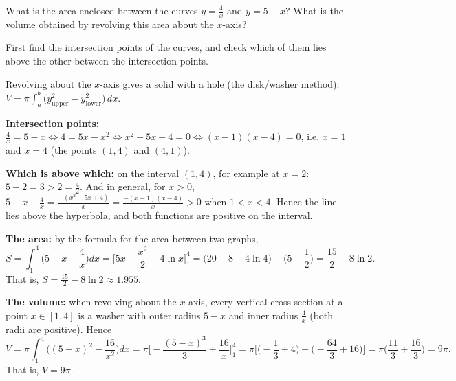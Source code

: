 
\begin{question}
What is the area enclosed between the curves $y=\frac{4}{x}$ and $y=5-x$?
What is the volume obtained by revolving this area about the $x$-axis?
\end{question}

\begin{hint}
First find the intersection points of the curves, and check which of them lies above the other between the intersection points.
\end{hint}

\begin{hint}
Revolving about the $x$-axis gives a solid with a hole (the disk/washer method): $V=\pi\int_a^b\big(y_{\text{upper}}^2-y_{\text{lower}}^2\big)\,dx$.
\end{hint}

\begin{solution}
\textbf{Intersection points:} $\frac4x=5-x \iff 4=5x-x^2 \iff x^2-5x+4=0 \iff (x-1)(x-4)=0$, i.e. $x=1$ and $x=4$ (the points $(1,4)$ and $(4,1)$).

\textbf{Which is above which:} on the interval $(1,4)$, for example at $x=2$: $5-2=3>2=\frac42$. And in general, for $x>0$,
$5-x-\frac4x=\frac{-(x^2-5x+4)}{x}=\frac{-(x-1)(x-4)}{x}>0$ when $1<x<4$. Hence the line lies above the hyperbola, and both functions are positive on the interval.

\textbf{The area:} by the formula for the area between two graphs,
\[ S=\int_1^4\Big(5-x-\frac4x\Big)dx=\Big[5x-\frac{x^2}{2}-4\ln x\Big]_1^4
=\Big(20-8-4\ln4\Big)-\Big(5-\frac12\Big)=\frac{15}{2}-8\ln2 . \]
That is, $\boxed{S=\frac{15}{2}-8\ln 2\approx 1.955}$.

\textbf{The volume:} when revolving about the $x$-axis, every vertical cross-section at a point $x\in[1,4]$ is a washer with outer radius $5-x$ and inner radius $\frac4x$ (both radii are positive). Hence
\[ V=\pi\int_1^4\Big((5-x)^2-\frac{16}{x^2}\Big)dx=\pi\Big[-\frac{(5-x)^3}{3}+\frac{16}{x}\Big]_1^4
=\pi\Big[\Big(-\frac13+4\Big)-\Big(-\frac{64}{3}+16\Big)\Big]=\pi\Big(\frac{11}{3}+\frac{16}{3}\Big)=9\pi . \]
That is, $\boxed{V=9\pi}$.
\end{solution}
